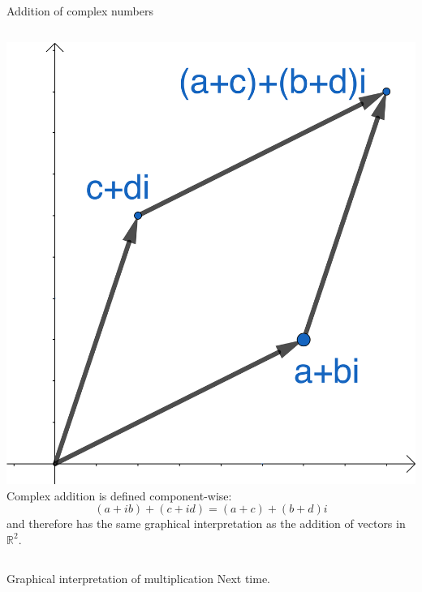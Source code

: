 \documentclass{beamer}
\begin{document}
\begin{frame}{Addition of complex numbers}
\begin{columns}
\includegraphics[scale=0.5]{complex-addition.png}
Complex addition is defined component-wise:
\begin{equation*}
(a+ib)+(c+id) = (a+c)+(b+d)i
\end{equation*}
and therefore has the same graphical interpretation as the addition of vectors in $\mathbb{R}^2$.
\end{columns}
\end{frame}

\begin{frame}{Graphical interpretation of multiplication}
Next time.
\end{frame}
\end{document}
